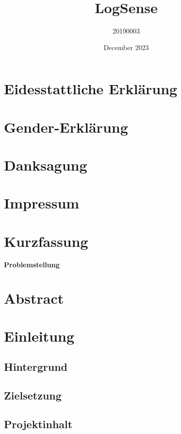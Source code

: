 \documentclass[pdftex,11pt,a4paper,oneside]{book}
\title{LogSense}
\author{20190003}
\date{December 2023}
\begin{document}
\maketitle

 {
    \fancyhead{}
    \fancyfoot{}
    \renewcommand{\headrulewidth}{0pt}
}

\chapter{Eidesstattliche Erklärung}

\chapter{Gender-Erklärung}

\chapter{Danksagung}

\chapter{Impressum}

\chapter{Kurzfassung}
\textbf{Problemstellung} 

\chapter{Abstract}

\tableofcontents

\chapter{Einleitung}
\section{Hintergrund}
\section{Zielsetzung}
\section{Projektinhalt}
\end{document}
